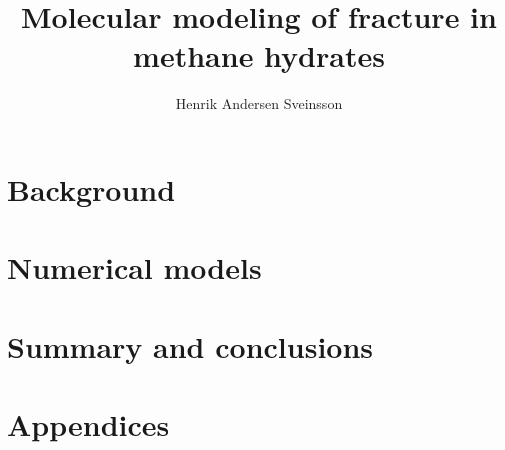 \documentclass[twoside, english, a4paper, 11pt]{uiofysmaster}
\title{Molecular modeling of fracture in methane hydrates}
\author{Henrik Andersen Sveinsson}
\begin{document}
\maketitle

\setlength{\parindent}{0em}
\setlength{\parskip}{1em}




\setlength{\parskip}{0em}
\tableofcontents
\setlength{\parindent}{2em}

\setcounter{page}{11}




\part{Background}






\part{Numerical models}





\part{Summary and conclusions}


\part{Appendices}
\appendix





\end{document}
